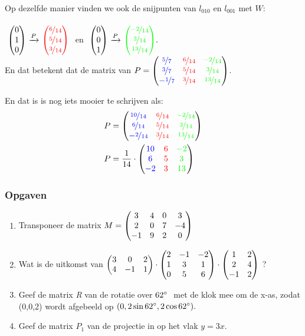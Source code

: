 Op dezelfde manier vinden we ook de snijpunten van $ l_{010} $ en  $ l_{001}  $ met $W$: \\ \\
$ \ \vecdrie{0}{1}{0}   \  \xrightarrow{P}  \  \vecdrie[red]{ \nicefrac{6}{14} }{\nicefrac{5}{14} }{\nicefrac{3}{14} }\ $ 
en \quad  
$  \ \vecdrie{0}{0}{1}   \  \xrightarrow{P}  \ \vecdrie[green]{\nicefrac{-2}{14} }{\nicefrac{3}{14} }{\nicefrac{13}{14}}. $  \\
En dat betekent dat de matrix van 
$ P = \begin{pmatrix}   {\color{blue}\nicefrac{5}{7}} &  {\color{red}\nicefrac{6}{14}} &   {\color{green}\nicefrac{-2}{14}}  \\    {\color{blue}\nicefrac{3}{7}}   &   {\color{red}\nicefrac{5}{14}} &  {\color{green}\nicefrac{3}{14}}  \\   {\color{blue}-\nicefrac{1}{7}} &   {\color{red}\nicefrac{3}{14}}  &   {\color{green}\nicefrac{13}{14}} \end{pmatrix} $.

En dat is is nog iets mooier te schrijven als:
\begin{align*}
P &= \begin{pmatrix}   {\color{blue}\nicefrac{10}{14}} &  {\color{red}\nicefrac{6}{14}} &   {\color{green}\nicefrac{-2}{14}}  \\    {\color{blue}\nicefrac{6}{14}}   &   {\color{red}\nicefrac{5}{14}} &  {\color{green}\nicefrac{3}{14}}  \\   {\color{blue}-\nicefrac{2}{14}} &   {\color{red}\nicefrac{3}{14}}  &   {\color{green}\nicefrac{13}{14}} \end{pmatrix} \\
P &= \frac{1}{14}\cdot \begin{pmatrix}   {\color{blue}10} &  {\color{red}6} &   {\color{green}-2}  \\    {\color{blue}6}   &   {\color{red}5} &  {\color{green}3}  \\   {\color{blue}-2} &   {\color{red}3}  &   {\color{green}13}  \end{pmatrix}
\end{align*}

\newpage
\subsubsection{Opgaven}
\begin{enumerate}
	\item Transponeer de matrix 
	$ M = \begin{pmatrix}  3 & 4 & 0 &  3 \\  2 &  0 & 7 & -4 \\ -1 & 9 & 2 & 0  \end{pmatrix} $
	
	\item Wat is de uitkomst van
	$ \begin{pmatrix}  3 & 0 & 2  \\  4 &  -1 & 1 \end{pmatrix} \cdot 
	\begin{pmatrix}  2 & -1 & -2  \\  1 &  3 & 1  \\ 0 & 5 & 6  \end{pmatrix}  \cdot 
	\begin{pmatrix}  1 & 2  \\  2 &  4  \\ -1 & 2  \end{pmatrix} $	? 
	
	\item Geef de matrix  \textit{R } van de rotatie over $ 62\degree \ $ met de klok mee om de x-as, zodat (0,0,2) wordt afgebeeld op $ (0, 2\sin 62\degree , 2\cos 62\degree ). $ \\
	
	\item Geef de matrix  \textit{$ P_1 $} van de projectie  in \RD op het vlak $  y=3x $. \\ \\
	
\end{enumerate}

